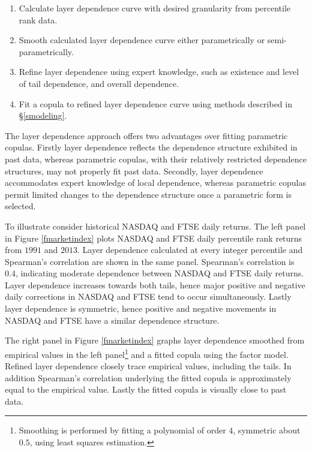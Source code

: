 \documentclass[authoryear]{elsarticle}
\newcommand{\fref}[1]{Figure \ref{#1}}
\newcommand{\sref}[1]{\S\ref{#1}}
\begin{document}
\begin{enumerate}
\item Calculate layer dependence curve with desired granularity from percentile rank data.

\item Smooth calculated layer dependence curve either parametrically or semi-parametrically.

\item Refine layer dependence using expert knowledge, such as existence and level of tail dependence, and overall dependence.

\item Fit a copula to refined layer dependence curve using methods described in \sref{smodeling}.
\end{enumerate}
The layer dependence approach offers two advantages over fitting parametric copulas. Firstly layer dependence reflects the dependence structure exhibited in past data, whereas parametric copulas, with their relatively restricted dependence structures, may not properly fit past data. Secondly, layer dependence accommodates expert knowledge of local dependence, whereas parametric copulas permit limited changes to the dependence structure once a parametric form is selected.

To illustrate consider historical NASDAQ and FTSE daily returns.  The left panel in \fref{fmarketindex} plots NASDAQ and FTSE daily percentile rank returns from $1991$ and $2013$. Layer dependence calculated at every integer percentile and Spearman's correlation are shown in the same panel. Spearman's correlation is $0.4$, indicating moderate dependence between NASDAQ and FTSE daily returns. Layer dependence increases towards both tails, hence major positive and negative daily corrections in NASDAQ and FTSE tend to occur simultaneously. Lastly layer dependence is symmetric, hence positive and negative movements in NASDAQ and FTSE have a similar dependence structure.

The right panel in \fref{fmarketindex} graphs layer dependence smoothed from empirical values in the left panel\footnote{Smoothing is performed by fitting a polynomial of order $4$, symmetric about $0.5$, using least squares estimation.} and a fitted copula using the factor model. Refined layer dependence closely trace empirical values, including the tails. In addition Spearman's correlation underlying the fitted copula is approximately equal to the empirical value. Lastly the fitted copula is visually close to past data.
\end{document}
